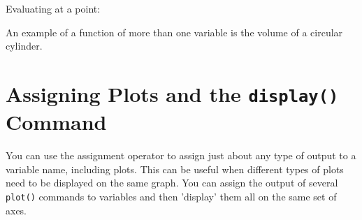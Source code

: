 \noindent
Evaluating at a point:

\begin{maplegroup}
\begin{mapleinput}
\end{mapleinput}
\mapleresult
\begin{maplelatex}
\end{maplelatex}
\end{maplegroup}


An example of a function of more than one variable is the volume of a circular cylinder.

\begin{maplegroup}
\begin{mapleinput}
\end{mapleinput}
\mapleresult
\begin{maplelatex}
\end{maplelatex}
\end{maplegroup}

\begin{maplegroup}
\begin{mapleinput}
\end{mapleinput}
\mapleresult
\begin{maplelatex}
\end{maplelatex}
\end{maplegroup}

\section{Assigning Plots and the \texttt{display()} Command}
\label{sec:display_command}

You can use the assignment operator to assign just about any type of output to a variable name, including plots. This can be useful when different types of plots need to be displayed on the same graph. You can assign the output of several \texttt{plot()} commands to variables and then 'display' them all on the same set of axes. 

